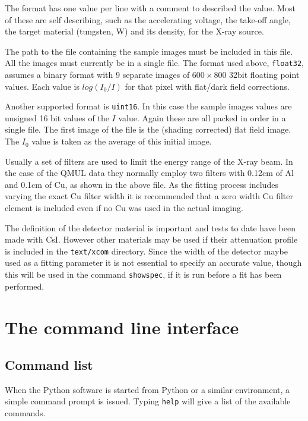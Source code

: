 \documentclass[a4paper,12pt]{article}
\begin{document}
The format has one value per line with a comment to described the value.
Most of these are self describing, such as the accelerating voltage, the take-off angle,
the target material (tungsten, W) and its density, for the X-ray source.

The path to the file containing the sample images must be included in this file.
All the images must currently be in a single file.
The format used above, \texttt{float32}, assumes a binary format with 9 separate images of $600 \times 800$ 32bit floating
point values.
Each value is $log ( I_0 / I )$ for that pixel with flat/dark field corrections.

Another supported format is \texttt{uint16}. In this case the sample images values are unsigned 16 bit values of the $I$ value.
Again these are all packed in order in a single file. The first image of the file is the (shading corrected) flat field image.
The $I_0$ value is taken as the average of this initial image.
 
Usually a set of filters are used to limit the energy range of the X-ray beam. In the case of the QMUL data they
normally employ two filters with 0.12cm of Al and 0.1cm of Cu, as shown in the above file.
As the fitting process includes varying the exact Cu filter width it is recommended that a zero width Cu filter element is included
even if no Cu was used in the actual imaging.

The definition of the detector material is important and tests to date have been made with CsI. However other materials may be used
if their attenuation profile is included in the \texttt{text/xcom} directory.
Since the width of the detector maybe used as a fitting parameter it is not essential to specify an accurate value, though this
will be used in the command \texttt{showspec}, if it is run before a fit has been performed.

\section{The command line interface}

\subsection{Command list}

When the Python software is started from Python or a similar environment, a simple command prompt is issued.
Typing \texttt{help} will give a list of the available commands.
\end{document}
